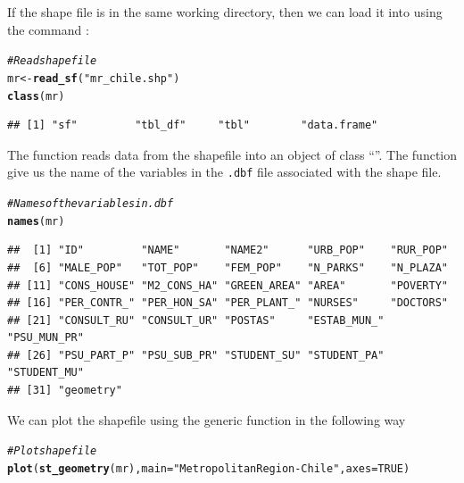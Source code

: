 \documentclass[english,12pt]{book}\usepackage[]{graphicx}\usepackage[]{xcolor}
\makeatletter
\newcommand{\hlnum}[1]{\textcolor[rgb]{0.686,0.059,0.569}{#1}}%
\newcommand{\hlstr}[1]{\textcolor[rgb]{0.192,0.494,0.8}{#1}}%
\newcommand{\hlcom}[1]{\textcolor[rgb]{0.678,0.584,0.686}{\textit{#1}}}%
\newcommand{\hlstd}[1]{\textcolor[rgb]{0.345,0.345,0.345}{#1}}%
\newcommand{\hlkwb}[1]{\textcolor[rgb]{0.69,0.353,0.396}{#1}}%
\newcommand{\hlkwc}[1]{\textcolor[rgb]{0.333,0.667,0.333}{#1}}%
\newcommand{\hlkwd}[1]{\textcolor[rgb]{0.737,0.353,0.396}{\textbf{#1}}}%
\newenvironment{kframe}{%
 \def\at@end@of@kframe{}%
 \ifinner\ifhmode%
  \def\at@end@of@kframe{\end{minipage}}%
  \begin{minipage}{\columnwidth}%
 \fi\fi%
 \def\FrameCommand##1{\hskip\@totalleftmargin \hskip-\fboxsep
 \colorbox{shadecolor}{##1}\hskip-\fboxsep
     \hskip-\linewidth \hskip-\@totalleftmargin \hskip\columnwidth}%
 \MakeFramed {\advance\hsize-\width
   \@totalleftmargin\z@ \linewidth\hsize
   \@setminipage}}%
 {\par\unskip\endMakeFramed%
 \at@end@of@kframe}
\newenvironment{knitrout}{}{} %
\makeatother
\begin{document}
If the shape file  is in the same working directory, then we can load it into  using the command :

\begin{knitrout}
\color{fgcolor}\begin{kframe}
\begin{alltt}
\hlcom{# Read shape file}
\hlstd{mr} \hlkwb{<-} \hlkwd{read_sf}\hlstd{(}\hlstr{"mr_chile.shp"}\hlstd{)}
\hlkwd{class}\hlstd{(mr)}
\end{alltt}
\begin{verbatim}
## [1] "sf"         "tbl_df"     "tbl"        "data.frame"
\end{verbatim}
\end{kframe}
\end{knitrout}

The function  reads data from the shapefile into an object of class ``''. The function  give us the name of the variables in the \texttt{.dbf} file associated with the shape file. 

\begin{knitrout}
\color{fgcolor}\begin{kframe}
\begin{alltt}
\hlcom{# Names of the variables in .dbf}
\hlkwd{names}\hlstd{(mr)}
\end{alltt}
\begin{verbatim}
##  [1] "ID"         "NAME"       "NAME2"      "URB_POP"    "RUR_POP"   
##  [6] "MALE_POP"   "TOT_POP"    "FEM_POP"    "N_PARKS"    "N_PLAZA"   
## [11] "CONS_HOUSE" "M2_CONS_HA" "GREEN_AREA" "AREA"       "POVERTY"   
## [16] "PER_CONTR_" "PER_HON_SA" "PER_PLANT_" "NURSES"     "DOCTORS"   
## [21] "CONSULT_RU" "CONSULT_UR" "POSTAS"     "ESTAB_MUN_" "PSU_MUN_PR"
## [26] "PSU_PART_P" "PSU_SUB_PR" "STUDENT_SU" "STUDENT_PA" "STUDENT_MU"
## [31] "geometry"
\end{verbatim}
\end{kframe}
\end{knitrout}

We can plot the shapefile using the generic function  in the following way

\begin{knitrout}
\color{fgcolor}\begin{kframe}
\begin{alltt}
\hlcom{# Plot shapefile}
\hlkwd{plot}\hlstd{(}\hlkwd{st_geometry}\hlstd{(mr),} \hlkwc{main} \hlstd{=} \hlstr{"Metropolitan Region-Chile"}\hlstd{,} \hlkwc{axes} \hlstd{=} \hlnum{TRUE}\hlstd{)}
\end{alltt}
\end{kframe}
\end{knitrout}
\end{document}
